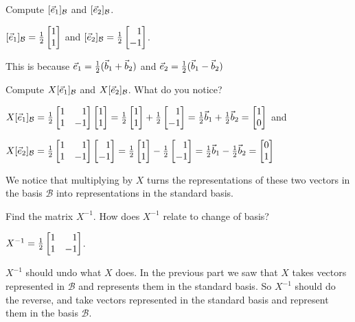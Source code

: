 	\begin{parts}
		\item Compute $[{\vec e_1}]_{\mathcal B}$ and $[{\vec e_2}]_{\mathcal B}$.
			\begin{solution}
				$[\xhat]_{\mathcal B}=\frac{1}{2}\mat{1\\1}$ and
				$[\yhat]_{\mathcal B}=\frac{1}{2}\mat{1\\-1}$.

				This is because ${\vec e_1}=\frac{1}{2}(\vec b_1+\vec b_2)$ and
				${\vec e_2}=\frac{1}{2}(\vec b_1-\vec b_2)$
			\end{solution}
		\item Compute $X[{\vec e_1}]_{\mathcal B}$ and $X[{\vec e_2}]_{\mathcal B}$.
			What do you notice?
			\begin{solution}
				$X[\xhat]_{\mathcal B}=\frac{1}{2}\mat{1&1\\1&-1}\mat{1\\1}
				=\frac{1}{2}\mat{1\\1}+\frac{1}{2}\mat{1\\-1}
				=\frac{1}{2}\vec b_1+\frac{1}{2}\vec b_2=\mat{1\\0}$
				and

				$X[\yhat]_{\mathcal B}=\frac{1}{2}\mat{1&1\\1&-1}\mat{1\\-1}
				=\frac{1}{2}\mat{1\\1}-\frac{1}{2}\mat{1\\-1}
				=\frac{1}{2}\vec b_1-\frac{1}{2}\vec b_2=\mat{0\\1}$

				We notice that multiplying by $X$ turns the representations	of
				these two vectors in the basis $\mathcal B$ into representations
				in the standard basis.
			\end{solution}
		\item Find the matrix $X^{-1}$. How does $X^{-1}$ relate to change of basis?
			\begin{solution}
				$X^{-1}=\tfrac{1}{2}\mat{1&1\\1&-1}$.

				$X^{-1}$ should undo what $X$ does. In the previous part we saw
				that $X$ takes vectors represented in $\mathcal B$ and represents
				them in the standard basis. So $X^{-1}$ should do the reverse, and
				take vectors represented in the standard basis and represent them
				in the basis $\mathcal B$.
			\end{solution}
	\end{parts}


